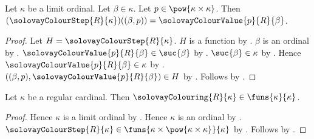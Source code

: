 \begin{proposition}\label{solovay_colour_step_apply}
    Let $\kappa$ be a limit ordinal.
    Let $\beta\in\kappa$.
    Let $p\in\pow{\kappa\times\kappa}$.
    Then $(\solovayColourStep{R}{\kappa})((\beta,p))
        =\solovayColourValue{p}{R}{\beta}$.
\end{proposition}
\begin{proof}
    Let $H=\solovayColourStep{R}{\kappa}$.
    $H$ is a function by .
    $\beta$ is an ordinal
        by .
    $\solovayColourValue{p}{R}{\beta}\in\suc{\beta}$
        by .
    $\suc{\beta}\in\kappa$ by .
    Hence $\solovayColourValue{p}{R}{\beta}\in\kappa$
        by .
    $((\beta,p),\solovayColourValue{p}{R}{\beta})\in H$
        by .
    Follows by .
\end{proof}

\begin{theorem}\label{solovay_colouring_type}
    Let $\kappa$ be a regular cardinal.
    Then $\solovayColouring{R}{\kappa}\in\funs{\kappa}{\kappa}$.
\end{theorem}
\begin{proof}
    Hence $\kappa$ is a limit ordinal
        by .
    Hence $\kappa$ is an ordinal by .
    $\solovayColourStep{R}{\kappa}
        \in\funs{\kappa\times\pow{\kappa\times\kappa}}{\kappa}$
        by .
    Follows by .
\end{proof}

